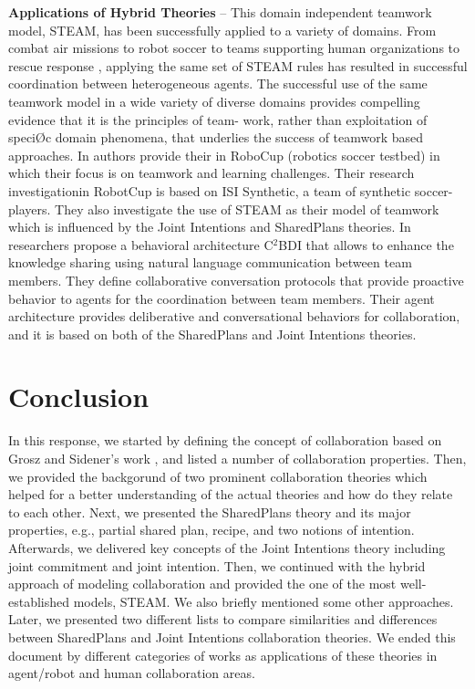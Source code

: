 \documentclass[11pt]{article}
\begin{document}
\textbf{Applications of Hybrid Theories} -- This domain independent teamwork
model, STEAM, has been successfully applied to a variety of domains.  From
combat air missions \cite{hill:synthetic-battlefield-aircraft} to robot soccer
\cite{kitano:robocup} to teams supporting human organizations
\cite{pynadath:teamwork-heterogeneous-agents} to rescue response
\cite{scerri:robot-agent-person}, applying the same set of STEAM rules has
resulted in successful coordination between heterogeneous agents. The successful
use of the same teamwork model in a wide variety of diverse domains provides
compelling evidence that it is the principles of team- work, rather than
exploitation of speciØc domain phenomena, that underlies the success of teamwork
based approaches. In \cite{marsella:robocup} authors provide their in RoboCup
(robotics soccer testbed) in which their focus is on teamwork and learning
challenges. Their research investigationin RobotCup is based on ISI Synthetic, a
team of synthetic soccer-players. They also investigate the use of STEAM as
their model of teamwork which is influenced by the Joint Intentions and
SharedPlans theories. In \cite{kabil:coordination-mechanisms} researchers
propose a behavioral architecture C$^2$BDI that allows to enhance the knowledge
sharing using natural language communication between team members. They define
collaborative conversation protocols that provide proactive behavior to agents
for the coordination between team members. Their agent architecture provides
deliberative and conversational behaviors for collaboration, and it is based
on both of the SharedPlans and Joint Intentions theories.

\section{Conclusion}

In this response, we started by defining the concept of collaboration based
on Grosz and Sidener's work \cite{grosz:plans-discourse}, and listed a number of
collaboration properties. Then, we provided the backgorund of two prominent
collaboration theories which helped for a better understanding of the actual
theories and how do they relate to each other. Next, we presented the
SharedPlans theory and its major properties, e.g., partial shared plan, recipe,
and two notions of intention. Afterwards, we delivered key concepts of the Joint
Intentions theory including joint commitment and joint intention. Then, we
continued with the hybrid approach of modeling collaboration and provided the
one of the most well-established models, STEAM. We also briefly mentioned some
other approaches. Later, we presented two different lists to compare
similarities and differences between SharedPlans and Joint Intentions
collaboration theories. We ended this document by different categories of works
as applications of these theories in agent/robot and human collaboration areas.
\end{document}

